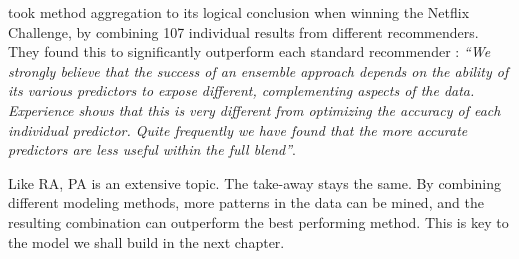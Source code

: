 \citeauthor{Bell2007} took method aggregation to its logical conclusion when winning the Netflix Challenge,
by combining 107 individual results from different recommenders.
They found this to significantly outperform each standard recommender \cite[p6]{Bell2007}:
\emph{``We strongly believe that the success of an ensemble approach depends on the ability of its various predictors to expose different, 
complementing aspects of the data. Experience shows that this is very different from optimizing the accuracy of each individual predictor. 
Quite frequently we have found that the more accurate predictors are less useful within the full blend''}.

Like RA, PA is an extensive topic.
The take-away stays the same. By combining different modeling methods,
more patterns in the data can be mined, and 
the resulting combination can outperform the best performing method.
This is key to the model we shall build in the next chapter.


